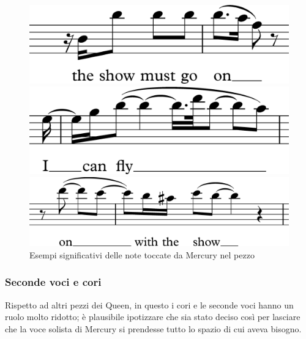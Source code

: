\documentclass[12pt]{article}
\begin{document}
\begin{figure}[H]
 \centering
 \begin{minipage}{0.4\textwidth}
  \centering
  \includegraphics[width=\textwidth,keepaspectratio]{vox/voice2}
 \end{minipage}
 \hfill
 \begin{minipage}{0.4\textwidth}
  \centering
  \includegraphics[width=\textwidth,keepaspectratio]{vox/voice3}
 \end{minipage}

 \begin{minipage}{0.4\textwidth}
  \centering
  \includegraphics[width=\textwidth,keepaspectratio]{vox/voice4}
 \end{minipage}

 \caption{Esempi significativi delle note toccate da Mercury nel pezzo}
 \label{fig:guitSolo}
\end{figure}

\subsubsection{Seconde voci e cori}
Rispetto ad altri pezzi dei Queen, in questo i cori e le seconde voci hanno un ruolo molto ridotto; è plausibile ipotizzare che sia stato deciso così per lasciare che la voce solista di Mercury si prendesse tutto lo spazio di cui aveva bisogno.
\end{document}
